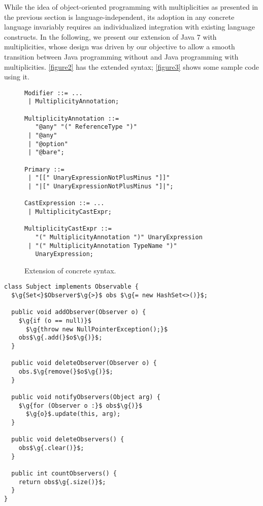 {\noindent While the idea of object-oriented programming with multiplicities
as presented in the previous section is language-independent, its adoption
in any concrete language invariably requires an individualized integration
with existing language constructs. In the following, we present our
extension of Java 7 with multiplicities, whose design was driven by our
objective to allow a smooth transition between Java programming without and
Java programming with multiplicities. \autoref{figure2} has the extended syntax;
\autoref{figure3} shows some sample code using it.

\begin{figure}[h]
  \begin{CenteredBox}
\begin{lstlisting}[basicstyle=\ttfamily\small]
Modifier ::= ...
 | MultiplicityAnnotation;

MultiplicityAnnotation ::=
   "@any" "(" ReferenceType ")"
 | "@any"
 | "@option"
 | "@bare";

Primary ::=
 | "[[" UnaryExpressionNotPlusMinus "]]"
 | "|[" UnaryExpressionNotPlusMinus "]|";

CastExpression ::= ...
 | MultiplicityCastExpr;

MultiplicityCastExpr ::=
   "(" MultiplicityAnnotation ")" UnaryExpression
 | "(" MultiplicityAnnotation TypeName ")"
   UnaryExpression;
\end{lstlisting}
  \end{CenteredBox}
\caption{Extension of concrete syntax.}
\label{figure2}
\end{figure}

\begin{lrbox}{\lstboxleft}
\begin{lstlisting}[basicstyle=\ttfamily\footnotesize]
class Subject implements Observable {
  $\g{Set<}$Observer$\g{>}$ obs $\g{= new HashSet<>()}$;

  public void addObserver(Observer o) {
    $\g{if (o == null)}$
      $\g{throw new NullPointerException();}$
    obs$\g{.add(}$o$\g{)}$;
  }

  public void deleteObserver(Observer o) {
    obs.$\g{remove(}$o$\g{)}$;
  }

  public void notifyObservers(Object arg) {
    $\g{for (Observer o :}$ obs$\g{)}$
      $\g{o}$.update(this, arg);
  }

  public void deleteObservers() {
    obs$\g{.clear()}$;
  }

  public int countObservers() {
    return obs$\g{.size()}$;
  }
}
\end{lstlisting}%
\end{lrbox}

}
